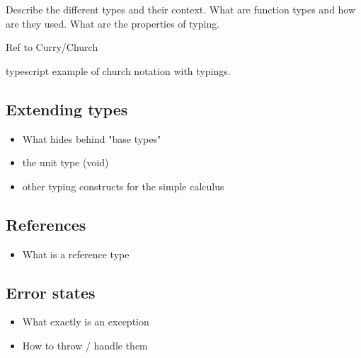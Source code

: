 Describe the different types and their context.
What are function types and how are they used.
What are the properties of typing.

Ref to Curry/Church

typescript example of church notation with typings.


\subsection{Extending types}

\begin{itemize}
    \item What hides behind "base types"
    \item the unit type (void)
    \item other typing constructs for the simple calculus
\end{itemize}

\subsection{References}

\begin{itemize}
    \item What is a reference type
\end{itemize}

\subsection{Error states}

\begin{itemize}
    \item What exactly is an exception
    \item How to throw / handle them
\end{itemize}
